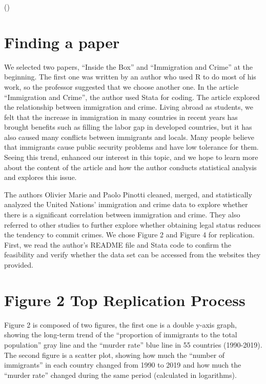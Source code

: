 \documentclass[
  jou,
  floatsintext,
  longtable,
  nolmodern,
  notxfonts,
  notimes,
  colorlinks=true,linkcolor=blue,citecolor=blue,urlcolor=blue]{apa7}
\begin{document}
()

\section{Finding a paper}\label{finding-a-paper}

We selected two papers, ``Inside the Box'' and ``Immigration and Crime''
at the beginning. The first one was written by an author who used R to
do most of his work, so the professor suggested that we choose another
one. In the article ``Immigration and Crime'', the author used Stata for
coding. The article explored the relationship between immigration and
crime. Living abroad as students, we felt that the increase in
immigration in many countries in recent years has brought benefits such
as filling the labor gap in developed countries, but it has also caused
many conflicts between immigrants and locals. Many people believe that
immigrants cause public security problems and have low tolerance for
them. Seeing this trend, enhanced our interest in this topic, and we
hope to learn more about the content of the article and how the author
conducts statistical analysis and explores this issue.

The authors Olivier Marie and Paolo Pinotti cleaned, merged, and
statistically analyzed the United Nations' immigration and crime data to
explore whether there is a significant correlation between immigration
and crime. They also referred to other studies to further explore
whether obtaining legal status reduces the tendency to commit crimes. We
chose Figure 2 and Figure 4 for replication. First, we read the author's
README file and Stata code to confirm the feasibility and verify whether
the data set can be accessed from the websites they provided.

\section{Figure 2 Top Replication
Process}\label{figure-2-top-replication-process}

Figure 2 is composed of two figures, the first one is a double y-axis
graph, showing the long-term trend of the ``proportion of immigrants to
the total population'' gray line and the ``murder rate'' blue line in 55
countries (1990-2019). The second figure is a scatter plot, showing how
much the ``number of immigrants'' in each country changed from 1990 to
2019 and how much the ``murder rate'' changed during the same period
(calculated in logarithms).
\end{document}
